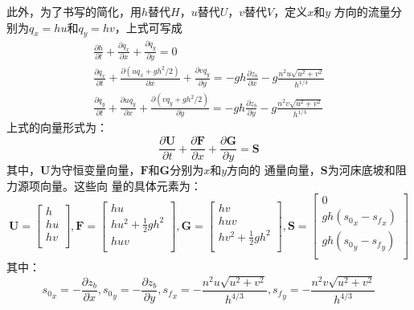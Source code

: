此外，为了书写的简化，用$h$替代$H$，$u$替代$U$，$v$替代$V$，定义$x$和$y$
方向的流量分别为$q_{x}=hu$和$q_{y}=hv$，上式可写成
\begin{equation}
  \begin{gathered}
    \frac{\partial h}{\partial t} +
    \frac{\partial q_{x}}{\partial x} +
    \frac{\partial q_{y}}{\partial y}
    =
    0
    \\
    \frac{\partial q_{x}}{\partial t} +
    \frac{\partial (uq_{x}+gh^{2}/2)}{\partial x} +
    \frac{\partial vq_{y}}{\partial y}
    =
    -gh\frac{\partial z_{b}}{\partial x}
    -g\frac{n^{2}u\sqrt{u^{2}+v^{2}}}{h^{1/3}}
    \\
    \frac{\partial q_{y}}{\partial t} +
    \frac{\partial uq_{y}}{\partial x} +
    \frac{\partial (vq_{y}+gh^{2}/2)}{\partial y}
    =
    -gh\frac{\partial z_{b}}{\partial y}
    -g\frac{n^{2}v\sqrt{u^{2}+v^{2}}}{h^{1/3}}
  \end{gathered}
\end{equation}
上式的向量形式为：
\begin{equation}
  \frac{\partial \mathbf{U}}{\partial t} +
  \frac{\partial \mathbf{F}}{\partial x} +
  \frac{\partial \mathbf{G}}{\partial y}
  =
  \mathbf{S}
\end{equation}
其中，$\mathbf{U}$为守恒变量向量，$\mathbf{F}$和$\mathbf{G}$分别为$x$和$y$方向的
通量向量，$\mathbf{S}$为河床底坡和阻力源项向量。这些向
量的具体元素为：
\begin{equation}
  \mathbf{U} =
  \begin{bmatrix}
    h \\
    hu \\
    hv \\
  \end{bmatrix}
  ,
  \mathbf{F} =
  \begin{bmatrix}
    hu \\
    hu^{2} + \frac{1}{2}gh^{2} \\
    huv \\
  \end{bmatrix}
  ,
  \mathbf{G} =
  \begin{bmatrix}
    hv \\
    huv \\
    hv^{2} + \frac{1}{2}gh^{2} \\
  \end{bmatrix}
  ,
  \mathbf{S} =
  \begin{bmatrix}
    0 \\
    gh({s_{0}}_{x} - {s_{f}}_{x})\\
    gh({s_{0}}_{y} - {s_{f}}_{y})\\
  \end{bmatrix}
\end{equation}
其中：
\begin{equation}
  {s_{0}}_{x} = - \frac{\partial z_{b}}{\partial x}, 
  {s_{0}}_{y} = - \frac{\partial z_{b}}{\partial y}, 
  {s_{f}}_{x} = - \frac{n^{2}u\sqrt{u^2+v^2}}{h^{4/3}}, 
  {s_{f}}_{y} = - \frac{n^{2}v\sqrt{u^2+v^2}}{h^{4/3}} 
\end{equation}


